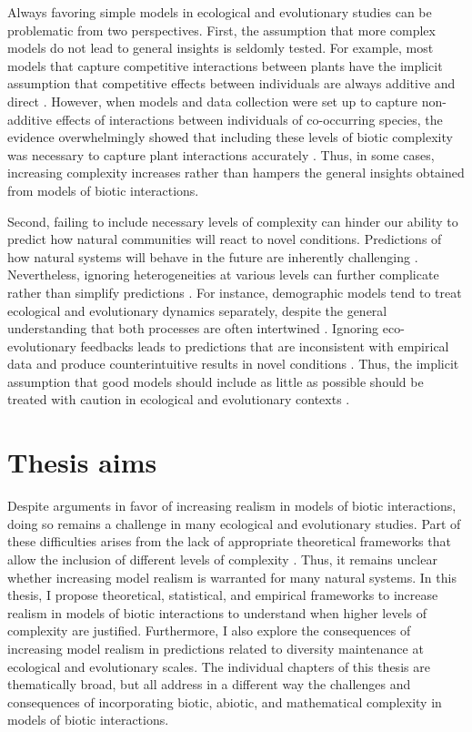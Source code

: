 \documentclass[12pt]{article}
\begin{document}
Always favoring simple models in ecological and evolutionary studies can be problematic from two perspectives. First, the assumption that more complex models do not lead to general insights is seldomly tested. For example, most models that capture competitive interactions between plants have the implicit assumption that competitive effects between individuals are always additive and direct \citep{schoener1974some,freckleton2001predicting,kraft2015plant}.  However, when models and data collection were set up to capture non-additive effects of interactions between individuals of co-occurring species, the evidence overwhelmingly showed that including these levels of biotic complexity was necessary to capture plant interactions accurately \citep{mayfield2017higher,martyn2021identifying,lai2021non}.  Thus, in some cases, increasing complexity increases rather than hampers the general insights obtained from models of biotic interactions.

Second, failing to include necessary levels of complexity can hinder our ability to predict how natural communities will react to novel conditions. Predictions of how natural systems will behave in the future are inherently challenging \citep{sutherland2006predicting}. Nevertheless, ignoring heterogeneities at various levels can further complicate rather than simplify predictions  \citep{evans2012predictive}. For instance, demographic models tend to treat ecological and evolutionary dynamics separately, despite the general understanding that both processes are often intertwined \citep{macarthur1962some,kokko2007ecogenetic}. Ignoring eco-evolutionary feedbacks leads to predictions that are inconsistent with empirical data and produce counterintuitive results in novel conditions \citep{kokko2007ecogenetic}. Thus, the implicit assumption that good models should include as little as possible should be treated with caution in ecological and evolutionary contexts \citep{evans2013simple, kokko2007ecogenetic,abrams2001describing}.


\section*{Thesis aims}

Despite arguments in favor of increasing realism in models of biotic interactions, doing so remains a challenge in many ecological and evolutionary studies.  Part of these difficulties arises from the lack of appropriate theoretical frameworks that allow the inclusion of different levels of complexity \citep{mayfield2017higher,martyn2021identifying}. Thus, it remains unclear whether increasing model realism is warranted for many natural systems. In this thesis, I propose theoretical, statistical, and empirical frameworks to increase realism in models of biotic interactions to understand when higher levels of complexity are justified. Furthermore, I also explore the consequences of increasing model realism in predictions related to diversity maintenance at ecological and evolutionary scales. The individual chapters of this thesis are thematically broad, but all address in a different way the challenges and consequences of incorporating biotic, abiotic, and mathematical complexity in models of biotic interactions.
\end{document}
